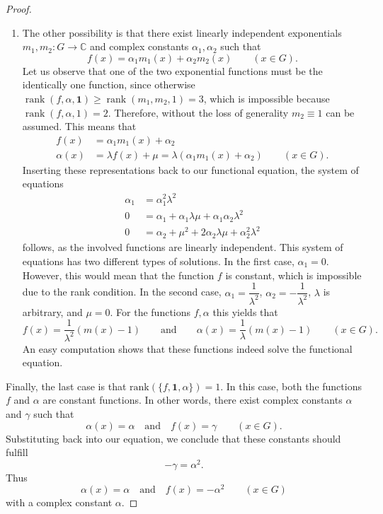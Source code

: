 \documentclass[a4paper,12pt]{article}
\theoremstyle{plain}
\theoremstyle{definition}
\theoremstyle{remark}
\begin{document}
\begin{proof}
\begin{enumerate}[{Subcase} (i)]
\item The other possibility is that there exist linearly independent exponentials $m_{1}, \allowbreak m_{2}\colon G\to \mathbb{C}$ and complex constants $\alpha_{1}, \alpha_{2}$ such that 
\[
 f(x)= \alpha_{1}m_{1}(x)+\alpha_{2}m_{2}(x) 
 \qquad 
 \left(x\in G\right). 
\]
Let us observe that one of the two exponential functions must be the identically one function, since otherwise $\operatorname{rank}(f, \alpha, \mathbf{1}) \geq \operatorname{rank}(m_1, m_2, {1}) = 3$, which is impossible because $\operatorname{rank}(f, \alpha, {1}) = 2$. Therefore, without the loss of generality $m_{2}\equiv 1$ can be assumed. 
This means that 
\begin{align*}
 f(x)&= \alpha_{1}m_{1}(x)+\alpha_{2}\\
 \alpha(x)& = \lambda f(x)+\mu= \lambda (\alpha_{1}m_{1}(x)+\alpha_{2}) 
 \qquad 
 \left(x\in G\right). 
\end{align*}
Inserting these representations back to our functional equation, the system of equations 
\begin{align*}
 \alpha_{1}&= \alpha_{1}^{2}\lambda^{2}\\
 0&=\alpha_{1}+\alpha_{1}\lambda\mu +\alpha_{1}\alpha_{2}\lambda^{2}\\
 0&= \alpha_{2}+\mu^{2}+2\alpha_{2}\lambda\mu +\alpha_{2}^2\lambda^{2}
\end{align*}
follows, as the involved functions are linearly independent. 
This system of equations has two different types of solutions. In the first case, $\alpha_{1} = 0$. However, this would mean that the function $f$ is constant, which is impossible due to the rank condition. In the second case,
$ \alpha_{1}= \dfrac{1}{\lambda^2}$, $\alpha_{2}= -\dfrac{1}{\lambda^2}$, $\lambda$ is arbitrary, and  $\mu=0$. For the functions $f, \alpha$ this yields that 
\[
 f(x)= \frac{1}{\lambda^2}(m(x)-1) 
 \qquad 
 \text{and}
 \qquad 
 \alpha(x)= \frac{1}{\lambda}(m(x)-1) 
 \qquad 
 \left(x\in G\right). 
\]
An easy computation shows that these functions indeed solve the functional equation. 
\end{enumerate}


Finally, the last case is that $\mathrm{rank}(\{f, \mathbf{1}, \alpha \})=1$. In this case, both the functions $f$ and $\alpha$ are constant functions. In other words, there exist complex constants $\alpha$ and $\gamma$ such that 
\[
 \alpha(x)= \alpha 
 \quad 
 \text{and}
 \quad
 f(x)= \gamma 
 \qquad 
 \left(x\in G\right). 
\]
Substituting back into our equation, we conclude that these constants should fulfill 
\[
 -\gamma= \alpha^2. 
\]
Thus 
\[
 \alpha(x)= \alpha 
 \quad 
 \text{and}
 \quad
 f(x)= -\alpha^2 
 \qquad 
 \left(x\in G\right)
\]
with a complex constant $\alpha$. 
\end{proof}
\end{document}
